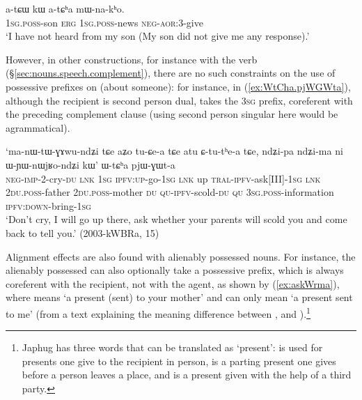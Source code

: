 \begin{exe}
\ex \label{ex:atCha.mWnakho}
\gll  a-tɕɯ kɯ a-tɕʰa mɯ-na-kʰo. \\
\textsc{1sg}.\textsc{poss}-son \textsc{erg} \textsc{1sg}.\textsc{poss}-news \textsc{neg}-\textsc{aor}:3\flobv{}-give \\
\glt `I have not heard from my son (My son did not give me any response).' 
\end{exe}

However, in other constructions, for instance with the verb (§\ref{sec:nouns.speech.complement}), there are no such constraints on the use of possessive prefixes on (about someone): for instance, in (\ref{ex:WtCha.pjWGWta}), although the recipient is second person dual,  takes the \textsc{3sg} prefix, coreferent with the preceding complement clause (using second person singular  here would be agrammatical).

\begin{exe}
\ex \label{ex:WtCha.pjWGWta}
\gll `ma-nɯ-tɯ-ɣɤwu-ndʑi tɕe aʑo tu-ɕe-a tɕe atu ɕ-tu-tʰe-a tɕe,
ndʑi-pa ndʑi-ma ni ɯ-ɲɯ-nɯjʁo-ndʑi kɯ' ɯ-tɕʰa pjɯ-ɣɯt-a \\
\textsc{neg}-\textsc{imp}-2-cry-\textsc{du} \textsc{lnk} \textsc{1sg} \textsc{ipfv}:\textsc{up}-go-\textsc{1sg} \textsc{lnk} up \textsc{tral}-\textsc{ipfv}-ask[III]-\textsc{1sg} \textsc{lnk} \textsc{2du}.\textsc{poss}-father \textsc{2du}.\textsc{poss}-mother \textsc{du} \textsc{qu}-\textsc{ipfv}-scold-\textsc{du} \textsc{qu} \textsc{3sg}.\textsc{poss}-information \textsc{ipfv}:\textsc{down}-bring-\textsc{1sg} \\
\glt `Don't cry, I will go up there, ask whether your parents will scold you and come back to tell you.' (2003-kWBRa, 15)
\end{exe}

Alignment effects are also found with alienably possessed nouns. For instance, the alienably possessed  can also optionally take a possessive prefix, which is always coreferent with the recipient, not with the agent, as shown by (\ref{ex:askWrma}), where  means `a present (sent) to your mother' and  can only mean `a present sent to me' (from a text explaining the meaning difference between ,  and ).\footnote{Japhug has three words that can be translated as `present':  is used for presents one give to the recipient in person,  is a parting present one gives before a person leaves a place, and  is a present given with the help of a third party.}

